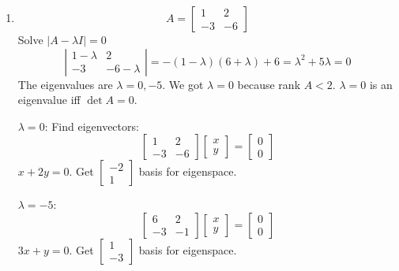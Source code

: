 \documentclass{article}
\begin{document}
\begin{enumerate}
  \item
  \[ A = \left[\begin{array}{cc}
       1 & 2\\
       - 3 & - 6
     \end{array}\right] \]
  Solve $| A - \lambda I | = 0$
  \[ \left|\begin{array}{cc}
       1 - \lambda & 2\\
       - 3 & - 6 - \lambda
     \end{array}\right| = - (1 - \lambda)  (6 + \lambda) + 6 = \lambda^2 + 5
     \lambda = 0 \]
  The eigenvalues are $\lambda = 0, - 5$. We got $\lambda = 0$ because rank $A
  < 2$. $\lambda = 0$ is an eigenvalue iff $\det A = 0$.
  
  {\underline{$\lambda = 0$}}: Find eigenvectors:
  \[ \left[\begin{array}{cc}
       1 & 2\\
       - 3 & - 6
     \end{array}\right]  \left[\begin{array}{c}
       x\\
       y
     \end{array}\right] = \left[\begin{array}{c}
       0\\
       0
     \end{array}\right] \]
  $x + 2 y = 0$. Get $\left[\begin{array}{c}
    - 2\\
    1
  \end{array}\right]$ basis for eigenspace.
  
  {\underline{$\lambda = - 5$}}:
  \[ \left[\begin{array}{cc}
       6 & 2\\
       - 3 & - 1
     \end{array}\right]  \left[\begin{array}{c}
       x\\
       y
     \end{array}\right] = \left[\begin{array}{c}
       0\\
       0
     \end{array}\right] \]
  $3 x + y = 0$. Get $\left[\begin{array}{c}
    1\\
    - 3
  \end{array}\right]$ basis for eigenspace.
  

\end{enumerate}
\end{document}
